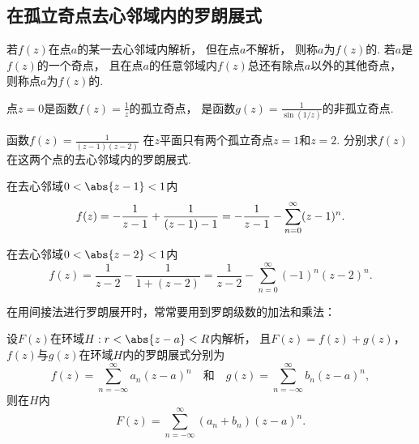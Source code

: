 \subsection{在孤立奇点去心邻域内的罗朗展式}
\begin{definition}
若\(f(z)\)在点\(a\)的某一去心邻域内解析，
但在点\(a\)不解析，
则称\(a\)为\(f(z)\)的.
若\(a\)是\(f(z)\)的一个奇点，
且在点\(a\)的任意邻域内\(f(z)\)总还有除点\(a\)以外的其他奇点，
则称点\(a\)为\(f(z)\)的.
\end{definition}

\begin{example}
点\(z=0\)是函数\(f(z) = \frac{1}{z}\)的孤立奇点，
是函数\(g(z) = \frac{1}{\sin(1/z)}\)的非孤立奇点.
\end{example}

\begin{example}
函数\(f(z) = \frac{1}{(z-1)(z-2)}\)
在\(z\)平面只有两个孤立奇点\(z=1\)和\(z=2\).
分别求\(f(z)\)在这两个点的去心邻域内的罗朗展式.
\begin{solution}
在去心邻域\(0<\abs{z-1}<1\)内\begin{equation*}
	f(z) = -\frac{1}{z-1} + \frac{1}{(z-1)-1} \\
	= -\frac{1}{z-1} - \sum_{n=0}^\infty (z-1)^n.
\end{equation*}

在去心邻域\(0<\abs{z-2}<1\)内\begin{equation*}
	f(z) = \frac{1}{z-2} - \frac{1}{1+(z-2)}
	= \frac{1}{z-2} - \sum_{n=0}^\infty (-1)^n (z-2)^n.
\end{equation*}
\end{solution}
\end{example}

在用间接法进行罗朗展开时，常常要用到罗朗级数的加法和乘法：
\begin{theorem}[罗朗级数的加法]
设\(F(z)\)在环域\(H: r < \abs{z-a} < R\)内解析，
且\(F(z) = f(z) + g(z)\)，
\(f(z)\)与\(g(z)\)在环域\(H\)内的罗朗展式分别为\begin{equation*}
	f(z) = \sum_{n=-\infty}^\infty a_n (z-a)^n
	\quad\text{和}\quad
	g(z) = \sum_{n=-\infty}^\infty b_n (z-a)^n,
\end{equation*}
则在\(H\)内\begin{equation*}
	F(z) = \sum_{n=-\infty}^\infty (a_n+b_n) (z-a)^n.
\end{equation*}
\end{theorem}


